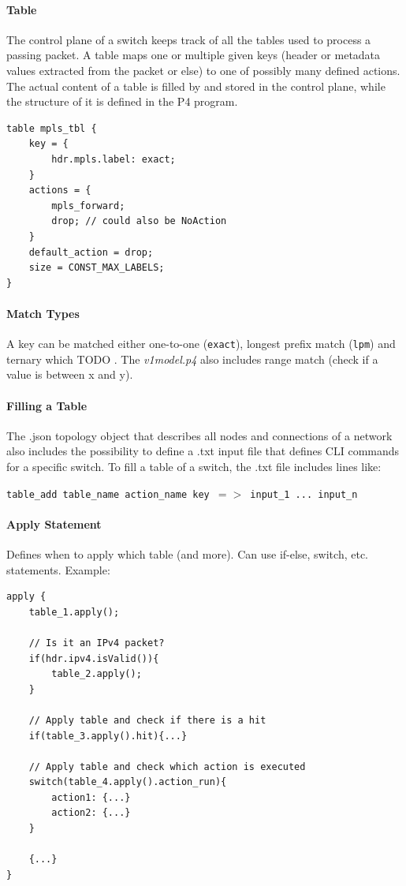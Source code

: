 \paragraph{Table}
The control plane of a switch keeps track of all the tables used to process a passing packet. A table maps one or multiple given keys (header or metadata values extracted from the packet or else) to one of possibly many defined actions. The actual content of a table is filled by and stored in the control plane, while the structure of it is defined in the P4 program.


\begin{lstlisting}
table mpls_tbl {
    key = {
        hdr.mpls.label: exact;
    }
    actions = {
        mpls_forward;
        drop; // could also be NoAction
    }
    default_action = drop;
    size = CONST_MAX_LABELS;
}
\end{lstlisting}

\paragraph{Match Types}
A key can be matched either one-to-one (\texttt{exact}), longest prefix match (\texttt{lpm}) and ternary which TODO . The \textit{v1model.p4} also includes range match (check if a value is between x and y).


\paragraph{Filling a Table}
The .json topology object that describes all nodes and connections of a network also includes the possibility to define a .txt input file that defines CLI commands for a specific switch. To fill a table of a switch, the .txt file includes lines like:

\texttt{table\_add table\_name action\_name key $=>$ input\_1 ... input\_n}

\paragraph{Apply Statement}
Defines when to apply which table (and more). Can use if-else, switch, etc. statements. Example:


\begin{lstlisting}
apply {
    table_1.apply();
    
    // Is it an IPv4 packet?
    if(hdr.ipv4.isValid()){
        table_2.apply();
    }
    
    // Apply table and check if there is a hit
    if(table_3.apply().hit){...}
    
    // Apply table and check which action is executed
    switch(table_4.apply().action_run){
        action1: {...}
        action2: {...}
    }
    
    {...}
}
\end{lstlisting}




